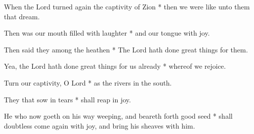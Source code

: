 When the Lord turned again the captivity of Zion * then we were like unto them that dream.

Then was our mouth filled with laughter * and our tongue with joy.

Then said they among the heathen * The Lord hath done great things for them.

Yea, the Lord hath done great things for us already * whereof we rejoice.

Turn our captivity, O Lord * as the rivers in the south.

They that sow in tears * shall reap in joy.

He who now goeth on his way weeping, and beareth forth good seed * shall doubtless come again with joy, and bring his sheaves with him.